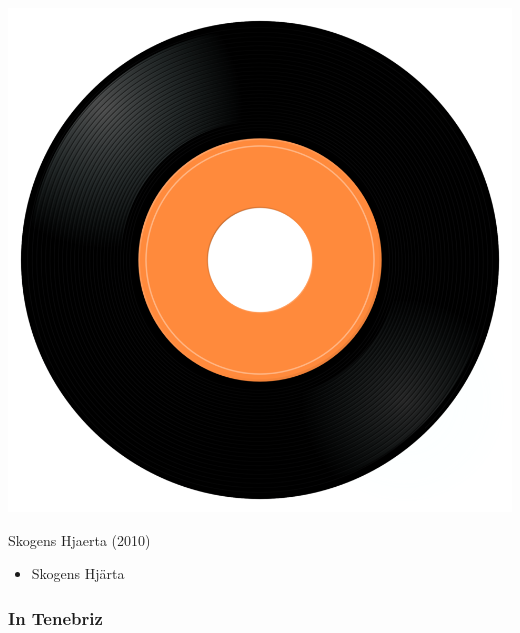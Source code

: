 \begin{minipage}[t]{0.25\textwidth}
\captionsetup{type=figure}
\includegraphics[width=\textwidth]{Images/cover.png}
\caption*{Skogens Hjaerta (2010)}
\end{minipage}
\begin{minipage}[t]{0.25\textwidth}\vspace{0pt}
\begin{itemize}[nosep,leftmargin=1em,labelwidth=*,align=left]
	\setlength{\itemsep}{0pt}
	\item Skogens Hjärta
\end{itemize}
\end{minipage}

\subsubsection{In Tenebriz}

